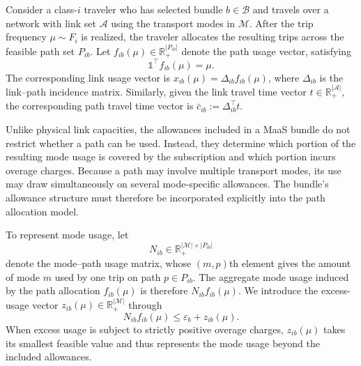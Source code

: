 \documentclass{article}
\newcommand{\setB}{\mathcal{B}}
\newcommand{\mbbone}{\mathbb{1}}
\begin{document}
Consider a class-$i$ traveler who has selected bundle $b\in\setB$ and travels over a network with link set $\mathcal A$ using the transport modes in $\mathcal M$. After the trip frequency $\mu\sim F_i$ is realized, the traveler allocates the resulting trips across the feasible path set $P_{ib}$. Let $f_{ib}(\mu)\in\mathbb{R}_+^{|P_{ib}|}$ denote the path usage vector, satisfying
\begin{equation}
    \mbbone^\top f_{ib}(\mu)=\mu.
    \label{eq:path-usage-conservation}
\end{equation}
The corresponding link usage vector is
$x_{ib}(\mu)=\Delta_{ib}f_{ib}(\mu)$, where $\Delta_{ib}$ is the link--path incidence matrix. Similarly, given the link travel time vector $t\in\mathbb{R}_+^{|\mathcal A|}$, the corresponding path travel time vector is
$\bar c_{ib}:=\Delta_{ib}^\top t$.

Unlike physical link capacities, the allowances included in a MaaS bundle do not restrict whether a path can be used. Instead, they determine which portion of the resulting mode usage is covered by the subscription and which portion incurs overage charges. Because a path may involve multiple transport modes, its use may draw simultaneously on several mode-specific allowances. The bundle's allowance structure must therefore be incorporated explicitly into the path allocation model.

To represent mode usage, let
\[
N_{ib}\in\mathbb{R}_+^{|\mathcal M|\times |P_{ib}|}
\]
denote the mode--path usage matrix, whose $(m,p)$th element gives the amount of mode $m$ used by one trip on path $p\in P_{ib}$. The aggregate mode usage induced by the path allocation $f_{ib}(\mu)$ is therefore $N_{ib}f_{ib}(\mu)$. We introduce the excess-usage vector
$z_{ib}(\mu)\in\mathbb{R}_+^{|\mathcal M|}$ through
\begin{equation}
    N_{ib}f_{ib}(\mu)
    \leq
    \varepsilon_b+z_{ib}(\mu).
    \label{eq:mode-allowance}
\end{equation}
When excess usage is subject to strictly positive overage charges, $z_{ib}(\mu)$ takes its smallest feasible value and thus represents the mode usage beyond the included allowances.
\end{document}
